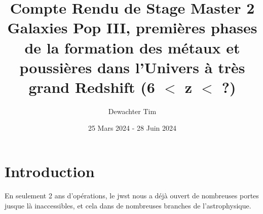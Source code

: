 \documentclass[11pt, a4paper, twocolumn]{article}
\title{\Huge Compte Rendu de Stage Master 2\\
\large Galaxies Pop III, premières phases de la formation des métaux et 
poussières dans l'Univers à très grand Redshift (6 $<$ z $<$ ?)}
\author{Dewachter Tim}
\date{25 Mars 2024 - 28 Juin 2024}
\begin{document}
\maketitle

\newpage

\section{Introduction}

En seulement 2 ans d'opérations, le \acrshort{jwst} nous a déjà ouvert de nombreuses 
portes jusque là inaccessibles, et cela dans de nombreuses branches de l'astrophysique.




\printnoidxglossaries
\end{document}
